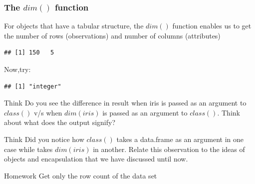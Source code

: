 \subsubsection{The $dim()$ function}
\noindent For objects that have a tabular structure, the $dim()$ function enables us to get the number of rows (observations) and number of columns (attributes)  
\begin{knitrout}
\color{fgcolor}\begin{kframe}
\begin{alltt}
 
\end{alltt}
\begin{verbatim}
## [1] 150   5
\end{verbatim}
\end{kframe}
\end{knitrout}
\noindent Now,try:
\begin{knitrout}
\color{fgcolor}\begin{kframe}
\begin{alltt}
\hlstd{(} 
\end{alltt}
\begin{verbatim}
## [1] "integer"
\end{verbatim}
\begin{alltt}
\end{alltt}
\end{kframe}
\end{knitrout}
\begin{DIY}{Think}
Do you see the difference in result when iris is passed as an argument to $class()$ v/s when $dim(iris)$ is passed as an argument to $class()$. Think about what does the output signify?   
\end{DIY}

\begin{DIY}{Think}
Did you notice how $class()$ takes a data.frame as an argument in one case while takes $dim(iris)$ in another. Relate this observation to the ideas of objects and encapsulation that we have discussed until now.   
\end{DIY}

\begin{DIY}{Homework}
Get only the row count of the data set
\end{DIY}

